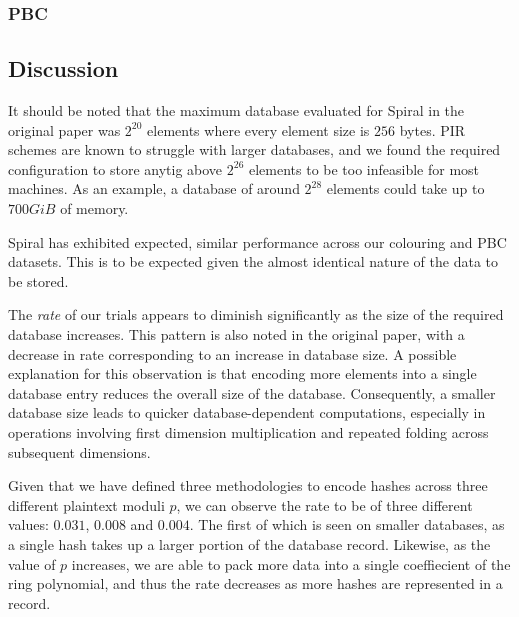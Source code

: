 \subsubsection{PBC}


\newpage

\newpage

\newpage

\newpage

\newpage

\newpage

\newpage


\newpage

\subsection{Discussion}

It should be noted that the maximum database evaluated for Spiral in the original
paper\cite{1} was $2^{20}$ elements where every element size is $256$ bytes. PIR schemes
are known to struggle with larger databases, and we found the required configuration to
store anytig above $2^{26}$ elements to be too infeasible for most machines. As an
example, a database of around $2^{28}$ elements could take up to $700GiB$ of memory.

Spiral has exhibited expected, similar performance across our colouring and PBC datasets.
This is to be expected given the almost identical nature of the data to be stored.

The \textit{rate} of our trials appears to diminish significantly as the size of the
required database increases. This pattern is also noted in the original paper\cite{1},
with a decrease in rate corresponding to an increase in database size. A possible
explanation for this observation is that encoding more elements into a single database
entry reduces the overall size of the database. Consequently, a smaller database size
leads to quicker database-dependent computations, especially in operations involving first
dimension multiplication and repeated folding across subsequent dimensions.

Given that we have defined three methodologies to encode hashes across three different
plaintext moduli $p$, we can observe the rate to be of three different values: $0.031$, $0.008$
and $0.004$. The first of which is seen on smaller databases, as a single hash takes up a
larger portion of the database record. Likewise, as the value of $p$ increases, we are
able to pack more data into a single coeffiecient of the ring polynomial, and thus the
rate decreases as more hashes are represented in a record.

